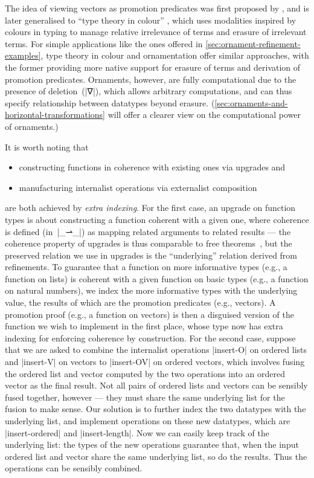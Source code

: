 The idea of viewing vectors as promotion predicates was first proposed by \citet[page~82]{Bernardy-thesis}, and is later generalised to ``type theory in colour'' \citep{Bernardy-color}, which uses modalities inspired by colours in typing to manage relative irrelevance of terms and erasure of irrelevant terms.
For simple applications like the ones offered in \autoref{sec:ornament-refinement-examples}, type theory in colour and ornamentation offer similar approaches, with the former providing more native support for erasure of terms and derivation of promotion predicates.
Ornaments, however, are fully computational due to the presence of deletion~(|∇|), which allows arbitrary computations, and can thus specify relationship between datatypes beyond erasure.
(\autoref{sec:ornaments-and-horizontal-transformations} will offer a clearer view on the computational power of ornaments.)

It is worth noting that
\begin{itemize}
\item constructing functions in coherence with existing ones via upgrades and
\item manufacturing internalist operations via externalist composition
\end{itemize}
are both achieved by \emph{extra indexing}.
For the first case, an upgrade on function types is about constructing a function coherent with a given one, where coherence is defined (in~|_⇀_|) as mapping related arguments to related results --- the coherence property of upgrades is thus comparable to free theorems~\citep{Wadler-theorems-for-free}, but the preserved relation we use in upgrades is the ``underlying'' relation derived from refinements.
To guarantee that a function on more informative types (e.g., a function on lists) is coherent with a given function on basic types (e.g., a function on natural numbers), we index the more informative types with the underlying value, the results of which are the promotion predicates (e.g., vectors).
A promotion proof (e.g., a function on vectors) is then a disguised version of the function we wish to implement in the first place, whose type now has extra indexing for enforcing coherence by construction.
For the second case, suppose that we are asked to combine the internalist operations |insert-O| on ordered lists and |insert-V| on vectors to |insert-OV| on ordered vectors, which involves fusing the ordered list and vector computed by the two operations into an ordered vector as the final result.
Not all pairs of ordered lists and vectors can be sensibly fused together, however --- they must share the same underlying list for the fusion to make sense.
Our solution is to further index the two datatypes with the underlying list, and implement operations on these new datatypes, which are |insert-ordered| and |insert-length|.
Now we can easily keep track of the underlying list: the types of the new operations guarantee that, when the input ordered list and vector share the same underlying list, so do the results.
Thus the operations can be sensibly combined.

